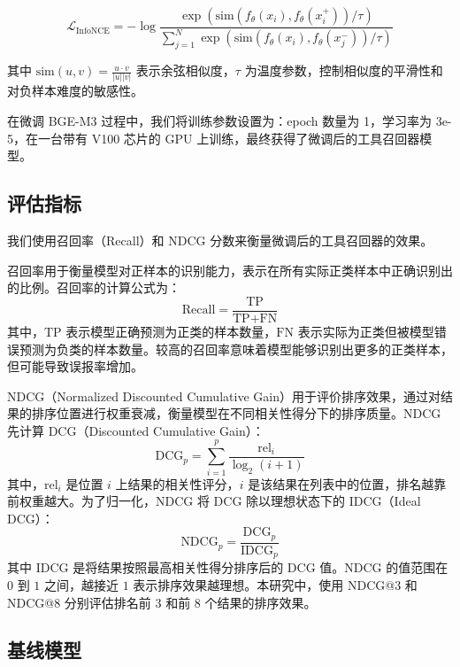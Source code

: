 \begin{equation}
\mathcal{L}_{\text{InfoNCE}} = -\log \frac{\exp(\text{sim}(f_{\theta}(x_i), f_{\theta}(x_i^+))/\tau)}{\sum_{j=1}^N \exp(\text{sim}(f_{\theta}(x_i), f_{\theta}(x_j^-))/\tau)}
\end{equation}

其中 $\text{sim}(u, v) = \frac{u \cdot v}{|u| |v|}$ 表示余弦相似度，$\tau$ 为温度参数，控制相似度的平滑性和对负样本难度的敏感性。

在微调 BGE-M3 过程中，我们将训练参数设置为：epoch 数量为 1，学习率为 3e-5，在一台带有 V100 芯片的 GPU 上训练，最终获得了微调后的工具召回器模型。

\subsection{评估指标}

我们使用召回率（Recall）\cite{buckland1994relationship, powers2020evaluation}和 NDCG 分数\cite{wang2013theoretical}来衡量微调后的工具召回器的效果。

召回率用于衡量模型对正样本的识别能力，表示在所有实际正类样本中正确识别出的比例。召回率的计算公式为：
\begin{equation}
\text{Recall} = \frac{\text{TP}}{\text{TP} + \text{FN}}
\end{equation}
其中，$\text{TP}$ 表示模型正确预测为正类的样本数量，$\text{FN}$ 表示实际为正类但被模型错误预测为负类的样本数量。较高的召回率意味着模型能够识别出更多的正类样本，但可能导致误报率增加。

NDCG（Normalized Discounted Cumulative Gain）用于评价排序效果，通过对结果的排序位置进行权重衰减，衡量模型在不同相关性得分下的排序质量。NDCG 先计算 DCG（Discounted Cumulative Gain）：
\begin{equation}
\text{DCG}_p = \sum_{i=1}^{p} \frac{\text{rel}_i}{\log_2(i+1)}
\end{equation}
其中，$\text{rel}_i$ 是位置 $i$ 上结果的相关性评分，$i$ 是该结果在列表中的位置，排名越靠前权重越大。为了归一化，NDCG 将 DCG 除以理想状态下的 IDCG（Ideal DCG）：
\begin{equation}
\text{NDCG}_p = \frac{\text{DCG}_p}{\text{IDCG}_p}
\end{equation}
其中 IDCG 是将结果按照最高相关性得分排序后的 DCG 值。NDCG 的值范围在 $0$ 到 $1$ 之间，越接近 $1$ 表示排序效果越理想。本研究中，使用 NDCG@3 和 NDCG@8 分别评估排名前 3 和前 8 个结果的排序效果。

\subsection{基线模型}

